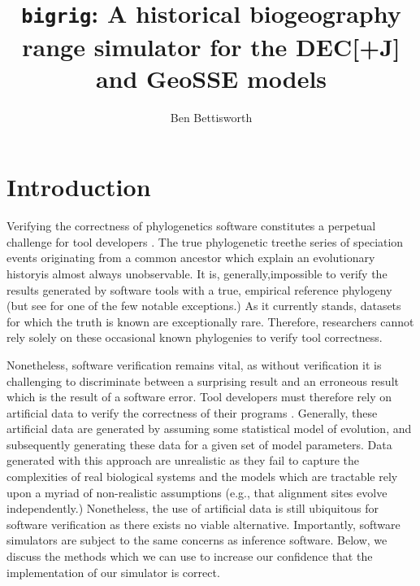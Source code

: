 \documentclass[a4paper]{article}
\title{\texttt{bigrig}: A historical biogeography range simulator for the
	DEC[+J] and GeoSSE models}
\author{Ben Bettisworth}
\begin{document}
\maketitle

\section{Introduction}

Verifying the correctness of phylogenetics software constitutes a perpetual challenge for tool developers
\cite{darribaStateSoftwareEvolutionary2018, mendesHowValidateBayesian2025, carver_software_2007,
bettisworth_lagrange-ng_2023}. 
The true phylogenetic tree\textemdash the series of speciation events originating from a common ancestor which explain an
evolutionary history\textemdash is almost always unobservable. 
It is, generally,impossible to verify the results generated by software tools with a true, empirical reference phylogeny (but see \cite{hillis_experimental_1992} for one of the few notable exceptions.) 
As it currently stands, datasets for which the truth is known are exceptionally rare.
Therefore, researchers cannot rely solely on these occasional known phylogenies to verify tool correctness.

Nonetheless, software verification remains vital, as without verification it is challenging to discriminate
between a surprising result and an erroneous result which is the result of a software error.
Tool developers must therefore rely on artificial data to verify the correctness of
their programs \cite{mendesHowValidateBayesian2025, ly-trong_alisim_2022, fletcher_indelible_2009}.
Generally, these artificial data are generated by assuming some statistical model of evolution, and subsequently generating these 
data for a given set of model parameters.
Data generated with this approach are unrealistic as they fail to capture the complexities of real biological systems 
\cite{trost_simulations_2024} and the models which are tractable rely upon a myriad of non-realistic assumptions (e.g., that alignment 
sites evolve independently.)
Nonetheless, the use of artificial data is still ubiquitous for software verification as there exists no viable alternative. 
Importantly, software simulators are subject to the same concerns as inference software.
Below, we discuss the methods which we can use to increase our confidence that the implementation of our simulator is correct. 
\end{document}
